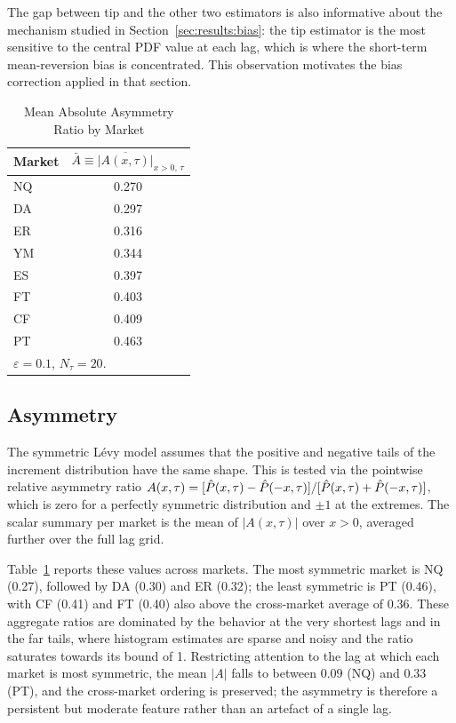 \documentclass[conference]{IEEEtran}
\begin{document}
The gap between tip and the other two estimators is also informative about
the mechanism studied in Section~\ref{sec:results:bias}: the tip estimator
is the most sensitive to the central PDF value at each lag, which is where
the short-term mean-reversion bias is concentrated.
This observation motivates the bias correction applied in that section.


\begin{table}[!t]
\begin{center}
\caption{Mean Absolute Asymmetry Ratio by Market}
\begin{tabular}{lc}
\hline
Market & $\bar{A} \equiv \overline{|A(x,\tau)|}_{x>0,\,\tau}$ \\
\hline
NQ & 0.270 \\
DA & 0.297 \\
ER & 0.316 \\
YM & 0.344 \\
ES & 0.397 \\
FT & 0.403 \\
CF & 0.409 \\
PT & 0.463 \\
\hline
\multicolumn{2}{l}{$\varepsilon=0.1$, $N_\tau=20$.}
\end{tabular}
\label{tab:asymmetry}
\end{center}
\end{table}

\subsection{Asymmetry}
\label{sec:results:asymmetry}

The symmetric Lévy model assumes that the positive and negative tails of the
increment distribution have the same shape.
This is tested via the pointwise relative asymmetry ratio
$A(x,\tau) = [\hat{P}(x,\tau) - \hat{P}(-x,\tau)]/[\hat{P}(x,\tau) + \hat{P}(-x,\tau)]$,
which is zero for a perfectly symmetric distribution and $\pm 1$ at the extremes.
The scalar summary per market is the mean of $|A(x,\tau)|$ over $x>0$,
averaged further over the full lag grid.

Table~\ref{tab:asymmetry} reports these values across markets.
The most symmetric market is NQ (0.27), followed by DA (0.30) and ER (0.32);
the least symmetric is PT (0.46), with CF (0.41) and FT (0.40) also above
the cross-market average of $0.36$.
These aggregate ratios are dominated by the behavior at the very shortest
lags and in the far tails, where histogram estimates are sparse and noisy and
the ratio saturates towards its bound of 1.
Restricting attention to the lag at which each market is most symmetric, the
mean $|A|$ falls to between $0.09$ (NQ) and $0.33$ (PT), and the cross-market
ordering is preserved; the asymmetry is therefore a persistent but moderate
feature rather than an artefact of a single lag.
\end{document}

